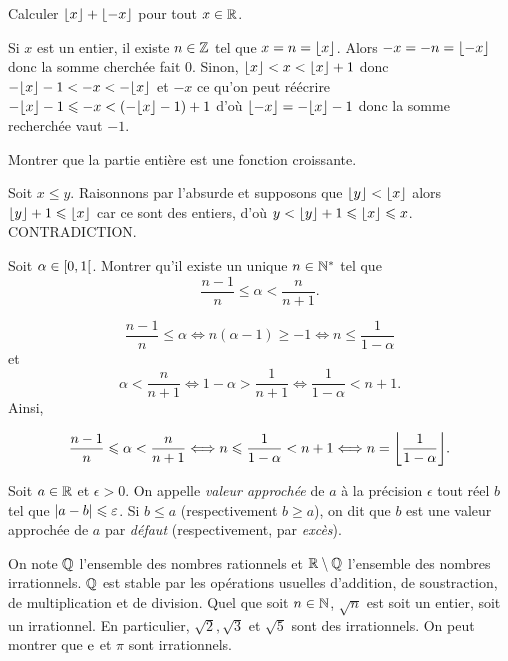 \documentclass{magnolia}
\begin{document}
\begin{exos}
\exo Calculer $\left\lfloor x\right\rfloor+\left\lfloor-x\right\rfloor$ pour tout $x\in\mathbb{R}$.
\begin{sol}
Si $x$ est un entier, il existe $n\in \mathbb{Z}$ tel que $x=n=\left\lfloor x\right\rfloor$. Alors $-x=-n=\left\lfloor-x\right\rfloor$ donc la somme cherchée fait $0$.
Sinon, $\left\lfloor x\right\rfloor<x<\left\lfloor x\right\rfloor+1$ donc $-\ent{x}-1<-x<-\ent{x}$ et $-x$ ce qu'on peut réécrire $-\ent{x}-1\leq -x<\p{-\ent{x}-1}+1$ d'où $\ent{-x}=-\ent{x}-1$ donc la somme recherchée vaut $-1$.
\end{sol}
\exo Montrer que la partie entière est une fonction croissante.
\begin{sol}
Soit $x\leq y$. Raisonnons par l'absurde et supposons que $\left\lfloor y\right\rfloor<\left\lfloor x\right\rfloor$ alors $\left\lfloor y\right\rfloor+1\leqslant \left\lfloor x\right\rfloor$ car ce sont des entiers, d'où $y<\left\lfloor y\right\rfloor+1\leqslant \left\lfloor x\right\rfloor\leqslant x$. CONTRADICTION.
\end{sol}
\exo Soit $\alpha\in\left[0,1\right[$. Montrer qu'il existe un unique
  $n\in{\mathbb{N}^*}$ tel que
  \[\frac{n-1}{n}\leq \alpha<\frac{n}{n+1}.\]
  \begin{sol}
$$\frac{n-1}{n}\leq \alpha \Longleftrightarrow n(\alpha-1)\geq -1 \Longleftrightarrow n\leq \frac{1}{1-\alpha} $$
et $$\alpha<\frac{n}{n+1} \Longleftrightarrow 1-\alpha > \frac{1}{n+1} \Longleftrightarrow \frac{1}{1-\alpha}<n+1.$$
Ainsi,

$$\frac{n-1}{n}\leq \alpha<\frac{n}{n+1} \Longleftrightarrow n\leq \frac{1}{1-\alpha}<n+1\Longleftrightarrow n=\ent{\frac{1}{1-\alpha}}.$$
  \end{sol}
\end{exos}



\begin{definition}[utile=-3]
Soit $a\in\mathbb{R}$ et $\epsilon>0$. On appelle \emph{valeur approchée} de $a$ à la précision
$\epsilon$ tout réel $b$ tel que $\left|a-b\right|\leqslant\varepsilon$.
Si $b\leq a$ (respectivement $b\geq a$), on dit que $b$ est une valeur approchée
de $a$ par \emph{défaut} (respectivement, par \emph{excès}).
\end{definition}

\begin{remarques}
\remarque On note $\mathbb{Q}$ l'ensemble des nombres rationnels et $\mathbb{R}\setminus\mathbb{Q}$ l'ensemble
  des nombres irrationnels. $\mathbb{Q}$ est stable par les opérations usuelles d'addition, de
	soustraction, de multiplication et de division.
\remarque Quel que soit $n\in\mathbb{N}$, $\sqrt{n}$ est soit un entier, soit un irrationnel.
  En particulier, $\sqrt{2}, \sqrt{3}$ et $\sqrt{5}$ sont des irrationnels. On peut
	montrer que ${\rm e}$ et $\pi$ sont irrationnels.
\end{remarques}
\end{document}
